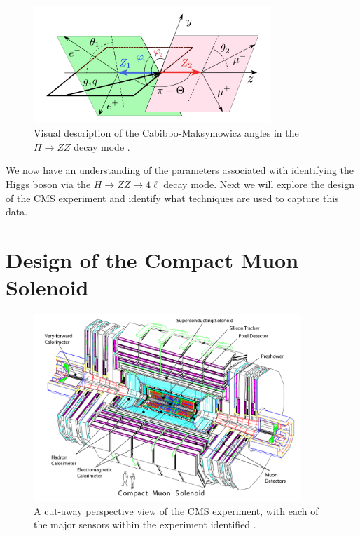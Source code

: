 \documentclass[12pt]{article}
\begin{document}
\begin{figure}[h!]
\centering
\includegraphics[width=0.8\textwidth]{images/HtoZZ_angles}
\caption{Visual description of the Cabibbo-Maksymowicz angles in the $H \to ZZ$ decay mode \cite{higgs_angles}.}
\label{angle_fig}
\end{figure}
\noindent
We now have an understanding of the parameters associated with identifying the Higgs boson via the $H \to ZZ \to 4 \ell$ decay mode. Next we will explore the design of the CMS experiment and identify what techniques are used to capture this data.

\section{Design of the Compact Muon Solenoid}

\begin{figure}[H]
\centering
\includegraphics[width = 0.9\textwidth]{images/cms_persp}
\caption{A cut-away perspective view of the CMS experiment, with each of the major sensors within the experiment identified \cite{cms_design}.}
\label{cms_persp}
\end{figure}
\end{document}
